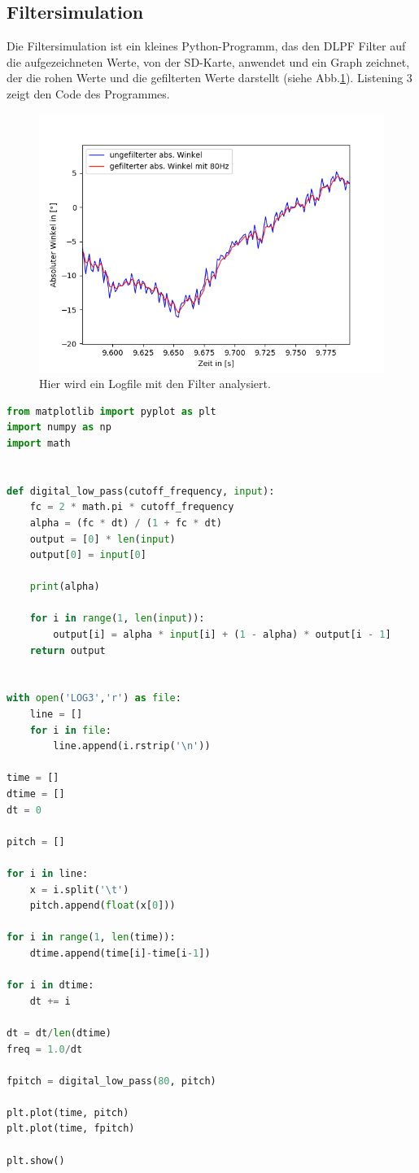 \documentclass[12pt,a4paper, ngerman]{article}
\begin{document}
\subsection{Filtersimulation}
Die Filtersimulation ist ein kleines Python-Programm, das den DLPF Filter auf die aufgezeichneten Werte, von der SD-Karte, anwendet und ein Graph zeichnet, der die rohen Werte und die gefilterten Werte darstellt (siehe Abb.\ref{list}). Listening 3 zeigt den Code des Programmes. 
\begin{figure}[h]
\centering
\includegraphics[width=\textwidth]{Figure_1.png}
\caption[]{Hier wird ein Logfile mit den Filter analysiert.}\label{list}
\end{figure}
\begin{lstlisting}[language=Python,caption=Filtersimulation]
from matplotlib import pyplot as plt
import numpy as np
import math


def digital_low_pass(cutoff_frequency, input):
    fc = 2 * math.pi * cutoff_frequency
    alpha = (fc * dt) / (1 + fc * dt)
    output = [0] * len(input)
    output[0] = input[0]

    print(alpha)

    for i in range(1, len(input)):
        output[i] = alpha * input[i] + (1 - alpha) * output[i - 1]
    return output


with open('LOG3','r') as file:
    line = []
    for i in file:
        line.append(i.rstrip('\n'))

time = []
dtime = []
dt = 0

pitch = []

for i in line:
    x = i.split('\t')
    pitch.append(float(x[0]))

for i in range(1, len(time)):
    dtime.append(time[i]-time[i-1])

for i in dtime:
    dt += i

dt = dt/len(dtime)
freq = 1.0/dt

fpitch = digital_low_pass(80, pitch)

plt.plot(time, pitch)
plt.plot(time, fpitch)

plt.show()
\end{lstlisting}
\newpage
\end{document}
